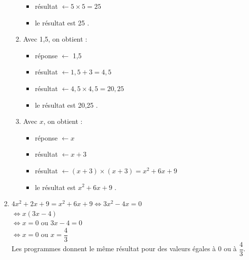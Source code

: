 \begin{corrige}
\begin{enumerate}
\begin{multicols}{3}
\begin{enumerate}
\begin{itemize}
                     \item résultat $\leftarrow5\times5 =25$
                     \item {\blue \og le résultat est 25 \fg}.
                  \end{itemize}
                  \columnbreak
               \item Avec 1,5, on obtient : \\
                  \begin{itemize}
                     \item réponse $\leftarrow$ 1,5
                     \item résultat $\leftarrow1,5+3 =4,5$
                     \item résultat $\leftarrow4,5\times4,5 =20,25$
                     \item {\blue \og le résultat est 20,25 \fg}.
                  \end{itemize}
                  \columnbreak
               \item Avec $x$, on obtient : \\
                  \begin{itemize}
                     \item réponse $\leftarrow x$
                     \item résultat $\leftarrow x+3$
                     \item résultat $\leftarrow(x+3)\times(x+3) =x^2+6x+9$
                     \item {\blue \og le résultat est $x^2+6x+9$ \fg}.
                  \end{itemize}
                  \columnbreak
            \end{enumerate}
         \end{multicols}
      \setcounter{enumi}{2}
      \item $4x^2+2x+9 =x^2+6x+9 \iff 3x^2-4x =0$ \\ 
         \hspace*{4.3cm} $\iff x(3x-4)$ \\
         \hspace*{4.3cm} $\iff x =0 \text{ ou } 3x-4 =0$ \\ [1mm]
         \hspace*{4.3cm} $\iff x =0 \text{ ou } x=\dfrac43$ \\
         {\blue Les programmes donnent le même résultat pour des valeurs égales à 0 ou à $\dfrac43$}.
   \end{enumerate}
\end{corrige}

